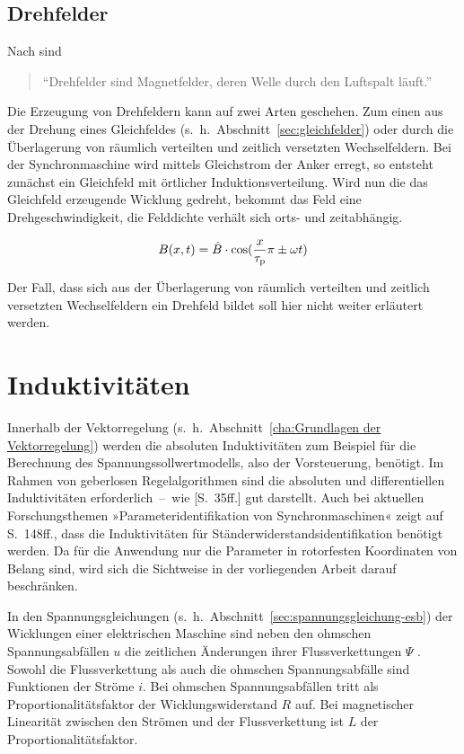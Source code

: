 \subsection{Drehfelder}\label{sec:drehfelder}

Nach \textcite{hofmann2013} sind

\begin{quote}
\enquote{Drehfelder sind Magnetfelder, deren Welle durch den Luftspalt läuft.}
\end{quote}

Die Erzeugung von Drehfeldern kann auf zwei Arten geschehen.
Zum einen aus der Drehung eines Gleichfeldes (s.~h.~Abschnitt~\ref{sec:gleichfelder}) oder durch die Überlagerung von räumlich verteilten und zeitlich versetzten Wechselfeldern.
Bei der Synchronmaschine wird mittels Gleichstrom der Anker erregt, so entsteht zunächst ein Gleichfeld mit örtlicher Induktionsverteilung.
Wird nun die das Gleichfeld erzeugende Wicklung gedreht, bekommt das Feld eine Drehgeschwindigkeit, \dh die Felddichte verhält sich orts- und zeitabhängig.

\begin{align}
B(x,t) = \hat{B}\cdot\cos(\frac{x}{\tau_{\mathrm{p}}}\pi\pm\omega t)
\end{align}

Der Fall, dass sich aus der Überlagerung von räumlich verteilten und zeitlich versetzten Wechselfeldern ein Drehfeld bildet soll hier nicht weiter erläutert werden.

\section{Induktivitäten}\label{sec:induktiv}

Innerhalb der Vektorregelung (s.~h.~Abschnitt~\ref{cha:Grundlagen der Vektorregelung}) werden die absoluten Induktivitäten zum Beispiel für die Berechnung des Spannungssollwertmodells, also der Vorsteuerung, benötigt.
Im Rahmen von geberlosen Regelalgorithmen sind die absoluten und differentiellen Induktivitäten erforderlich~--~wie \textcite{kellner2012}[S.~35ff.] gut darstellt.
Auch bei aktuellen Forschungsthemen »Parameteridentifikation von Synchronmaschinen« zeigt \textcite{kellner2012} auf S.~148ff., dass die Induktivitäten für Ständerwiderstandsidentifikation benötigt werden.
Da für die Anwendung nur die Parameter in rotorfesten Koordinaten von Belang sind, wird sich die Sichtweise in der vorliegenden Arbeit darauf beschränken.

In den Spannungsgleichungen (s.~h.~Abschnitt~\ref{sec:spannungsgleichung-esb}) der Wicklungen einer elektrischen Maschine sind neben den ohmschen Spannungsabfällen $u$ die zeitlichen Änderungen ihrer Flussverkettungen $\Psi$ \autocite[S.~511]{mullerII2008}.
Sowohl die Flussverkettung als auch die ohmschen Spannungsabfälle sind Funktionen der Ströme $i$.
Bei ohmschen Spannungsabfällen tritt als Proportionalitätsfaktor der Wicklungswiderstand $R$ auf.
Bei magnetischer Linearität zwischen den Strömen und der Flussverkettung ist $L$ der Proportionalitätsfaktor.

